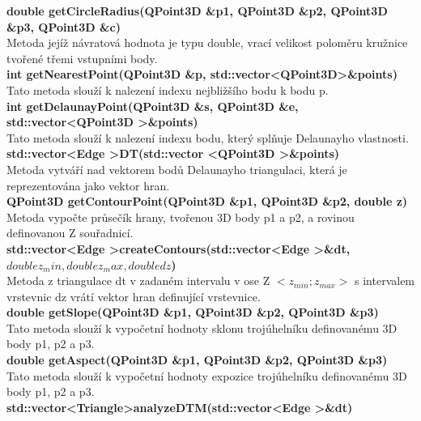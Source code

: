 \documentclass[a4paper, 12pt]{article}
\begin{document}
\textbf{double getCircleRadius(QPoint3D \&p1, QPoint3D \&p2, QPoint3D \&p3, QPoint3D \&c)}\\
Metoda jejíž návratová hodnota je typu double, vrací velikost poloměru kružnice tvořené třemi vstupními body.\\

\textbf{int getNearestPoint(QPoint3D \&p, std::vector\textless QPoint3D\textgreater \&points)}\\
Tato metoda slouží k nalezení indexu nejbližšího bodu k bodu p.\\

\textbf{int getDelaunayPoint(QPoint3D \&s, QPoint3D \&e, std::vector\textless QPoint3D \textgreater \&points)}\\
Tato metoda slouží k nalezení indexu bodu, který splňuje Delaunayho vlastnosti.\\

\textbf{std::vector\textless Edge \textgreater DT(std::vector \textless QPoint3D \textgreater \&points)}\\
Metoda vytváří nad vektorem bodů Delaunayho triangulaci, která je reprezentována jako vektor hran.\\

\textbf{QPoint3D getContourPoint(QPoint3D \&p1, QPoint3D \&p2, double z)}\\
Metoda vypočte průsečík hrany, tvořenou 3D body p1 a p2, a rovinou definovanou Z souřadnicí.\\

\textbf{std::vector\textless Edge \textgreater createContours(std::vector\textless Edge \textgreater \&dt, $double z_min, double z_max, double dz$)}\\
Metoda z triangulace dt v zadaném intervalu v ose Z $<z_{min} ; z_{max}>$ s intervalem vrstevnic dz vrátí vektor hran definující vrstevnice.\\

\textbf{double getSlope(QPoint3D \&p1, QPoint3D \&p2, QPoint3D \&p3)}\\
Tato metoda slouží k vypočetní hodnoty sklonu trojúhelníku definovanému 3D body p1, p2 a p3.\\

\textbf{double getAspect(QPoint3D \&p1, QPoint3D \&p2, QPoint3D \&p3)}\\
Tato metoda slouží k vypočetní hodnoty expozice trojúhelníku definovanému 3D body p1, p2 a p3.\\

\textbf{std::vector\textless Triangle\textgreater analyzeDTM(std::vector\textless Edge \textgreater \&dt)}\\
\\
\end{document}

